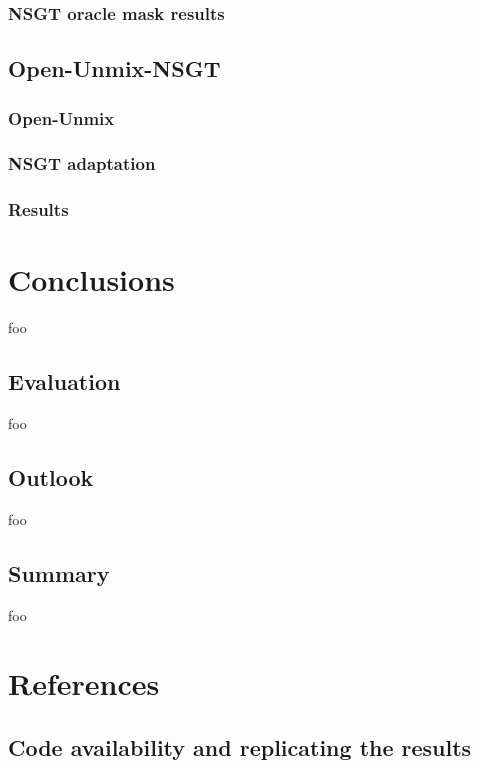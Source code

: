 \documentclass[letter,12pt,notitlepage]{article}
\begin{document}
\subsubsection{NSGT oracle mask results}



\subsection{Open-Unmix-NSGT}


\subsubsection{Open-Unmix}

\subsubsection{NSGT adaptation}

\subsubsection{Results}

\vfill
\clearpage

\section{Conclusions}
\label{sec:conclusion}

foo

\subsection{Evaluation}

foo

\subsection{Outlook}

foo

\subsection{Summary}

foo

\vfill
\clearpage %

\section{References}
\printbibliography[heading=none]

\vfill
\clearpage %

\begin{appendices}

\section{Code availability and replicating the results}
\label{appendix:coderesultsrepro}

\end{appendices}
\end{document}
